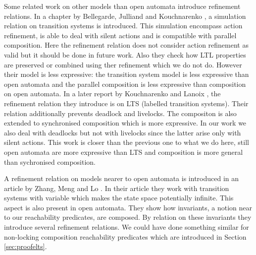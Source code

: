 \documentclass{article}
\begin{document}
Some related work on other models than open automata introduce refinement relations.
In a chapter by Bellegarde, Julliand and Kouchnarenko \cite{10.1007/3-540-46428-X_19}, a simulation relation on transition systems is introduced.
This simulation encompass action refinement, is able to deal with silent actions and is compatible with parallel composition.
Here the refinement relation does not consider action refinement as valid but it should be done in future work.
Also they check how LTL properties are preserved or combined using ther refinement which we do not do.
However their model is less expressive: the transition system model is less expressive than open automata and the parallel composition is less expressive than composition on open automata.
In a later report by Kouchnarenko and Lanoix \cite{10.1007/978-3-540-70881-0_26}, the refinement relation they introduce is on LTS (labelled transition systems).
Their relation additionally prevents deadlock and livelocks.
The compositon is also extended to synchronised composition which is more expressive.
In our work we also deal with deadlocks but not with livelocks since the latter arise only with silent actions.
This work is closer than the previous one to what we do here, still open automata are more expressive than LTS and composition is more general than sychronised composition.

A refinement relation on models nearer to open automata is introduced in an article by Zhang, Meng and Lo \cite{Zhang2014}.
In their article they work with transition systems with variable which makes the state space potentially infinite.
This aspect is also present in open automata.
They show how invariants, a notion near to our reachability predicates, are composed.
By relation on these invariants they introduce several refinement relations.
We could have done something similar for non-locking composition reachability predicates which are introduced in Section \ref{sec:proofelts}.
\end{document}

